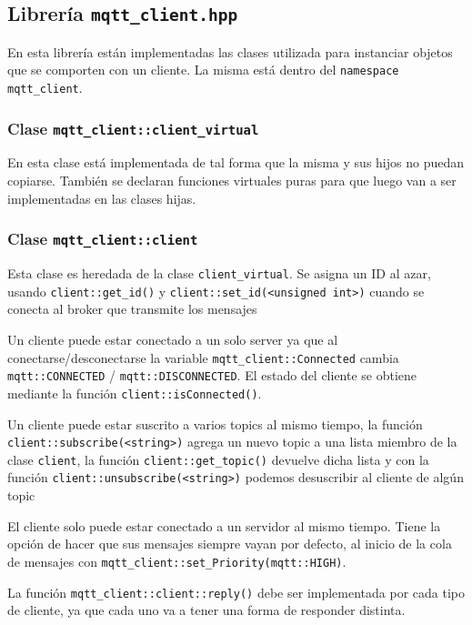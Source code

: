 \subsection{Librería \texttt{mqtt\_client.hpp}}

    En esta librería están implementadas las clases utilizada para instanciar objetos que se comporten con un cliente. La misma está dentro del \texttt{namespace mqtt\_client}.

    \subsubsection{Clase \texttt{mqtt\_client::client\_virtual}}
    En esta clase está  implementada de tal forma que la misma y sus hijos no puedan copiarse. También se declaran funciones virtuales puras para que luego van a ser implementadas en las clases hijas.

    \subsubsection{Clase \texttt{mqtt\_client::client}}

    Esta clase es heredada de la clase \verb|client_virtual|. Se asigna un ID al azar, usando \verb|client::get_id()| y \verb|client::set_id(<unsigned int>)|  cuando se conecta al broker que transmite los mensajes

    Un cliente puede estar conectado a un solo server ya que al conectarse/desconectarse la variable \verb|mqtt_client::Connected| cambia \verb|mqtt::CONNECTED| / \verb|mqtt::DISCONNECTED|. El estado del cliente se obtiene mediante la función \verb|client::isConnected()|.

    Un cliente puede estar suscrito a varios topics al mismo tiempo, la función \verb|client::subscribe(<string>)|  agrega un nuevo topic a una lista miembro de la clase \verb|client|, la función \verb|client::get_topic()| devuelve dicha lista y con la función \verb|client::unsubscribe(<string>)|  podemos desuscribir al cliente de algún topic

    El cliente solo puede estar conectado a un servidor
    al mismo tiempo. Tiene la opción de hacer que sus mensajes siempre vayan por defecto, al inicio de la cola de mensajes con  \verb|mqtt_client::set_Priority(mqtt::HIGH)|.

    La función \verb|mqtt_client::client::reply()| debe ser implementada por cada tipo de cliente, ya  que cada uno va a tener una forma de responder distinta.



